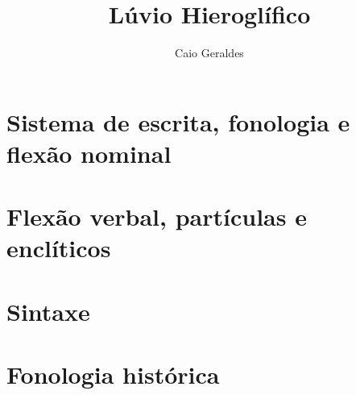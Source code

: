 \documentclass{luviolivro}
\title{Lúvio Hieroglífico}
\author{Caio Geraldes}
\begin{document}
\frontmatter

\thetitlepage%


\cleardoublepage%


\cleardoublepage%
\tableofcontents*

\cleardoublepage%
\listoffigures*

\mainmatter%




\chapter{Sistema de escrita, fonologia e flexão nominal}


\chapter{Flexão verbal, partículas e enclíticos}


\chapter{Sintaxe}


\chapter{Fonologia histórica}





\backmatter%











{
	\SingleSpacing*
	\printbibliography%
}

\cleardoublepage%

\colofao{}
\end{document}
